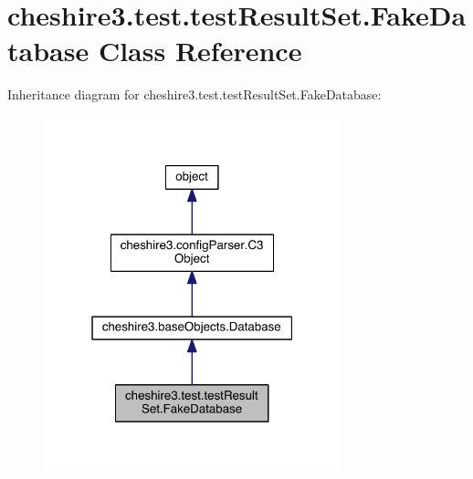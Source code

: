 \hypertarget{classcheshire3_1_1test_1_1test_result_set_1_1_fake_database}{\section{cheshire3.\-test.\-test\-Result\-Set.\-Fake\-Database Class Reference}
\label{classcheshire3_1_1test_1_1test_result_set_1_1_fake_database}
}


Inheritance diagram for cheshire3.\-test.\-test\-Result\-Set.\-Fake\-Database\-:
\nopagebreak
\begin{figure}[H]
\begin{center}
\leavevmode
\includegraphics[width=244pt]{classcheshire3_1_1test_1_1test_result_set_1_1_fake_database__inherit__graph}
\end{center}
\end{figure}



